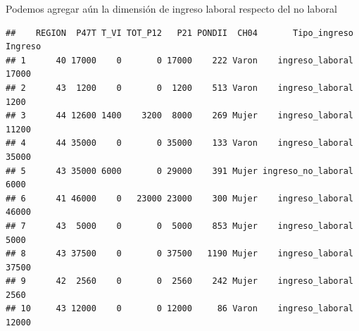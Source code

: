 \documentclass[]{book}
\newenvironment{Shaded}{\begin{snugshade}}{\end{snugshade}}
\newcommand{\CommentTok}[1]{\textcolor[rgb]{0.56,0.35,0.01}{\textit{#1}}}
\newcommand{\DataTypeTok}[1]{\textcolor[rgb]{0.13,0.29,0.53}{#1}}
\newcommand{\DecValTok}[1]{\textcolor[rgb]{0.00,0.00,0.81}{#1}}
\newcommand{\KeywordTok}[1]{\textcolor[rgb]{0.13,0.29,0.53}{\textbf{#1}}}
\newcommand{\NormalTok}[1]{#1}
\newcommand{\OperatorTok}[1]{\textcolor[rgb]{0.81,0.36,0.00}{\textbf{#1}}}
\newcommand{\StringTok}[1]{\textcolor[rgb]{0.31,0.60,0.02}{#1}}
\begin{document}
Podemos agregar aún la dimensión de ingreso laboral respecto del no laboral

\begin{Shaded}
\end{Shaded}

\begin{verbatim}
##    REGION  P47T T_VI TOT_P12   P21 PONDII  CH04       Tipo_ingreso Ingreso
## 1      40 17000    0       0 17000    222 Varon    ingreso_laboral   17000
## 2      43  1200    0       0  1200    513 Varon    ingreso_laboral    1200
## 3      44 12600 1400    3200  8000    269 Mujer    ingreso_laboral   11200
## 4      44 35000    0       0 35000    133 Varon    ingreso_laboral   35000
## 5      43 35000 6000       0 29000    391 Mujer ingreso_no_laboral    6000
## 6      41 46000    0   23000 23000    300 Mujer    ingreso_laboral   46000
## 7      43  5000    0       0  5000    853 Mujer    ingreso_laboral    5000
## 8      43 37500    0       0 37500   1190 Mujer    ingreso_laboral   37500
## 9      42  2560    0       0  2560    242 Mujer    ingreso_laboral    2560
## 10     43 12000    0       0 12000     86 Varon    ingreso_laboral   12000
\end{verbatim}
\end{document}
